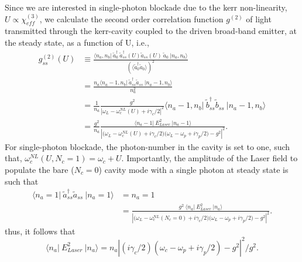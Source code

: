 \documentclass[12pt]{article}
\begin{document}
Since we are interested in single-photon blockade due to the kerr 
non-linearity, $U \propto \chi_{eff}^{(3)}$, we calculate the second order
correlation function $g^{(2)}$ of light transmitted through the kerr-cavity
coupled to the driven broad-band emitter, at the steady state, as a function
of U, i.e.,
\begin{equation}
\begin{split}
g^{(2)}_{ss}(U) &\equiv 
    \frac{ \langle n_a, n_b \vert \:
    \tilde{a}^{\dagger}_0 \: \tilde{a}^{\dagger}_{ss}(U)
    \tilde{a}_{ss}(U) \: \tilde{a}_0 \:
    \vert n_a, n_b \rangle }
    {(\langle \tilde{a}^{\dagger}_0\tilde{a}_0 \rangle)^2}
\\
&= \frac{n_a \langle n_a - 1, n_b \vert \:
    \tilde{a}^{\dagger}_{ss}\tilde{a}_{ss} \:
    \vert n_a - 1, n_b \rangle}
    {n_a^2}
\\
&= \frac{1}{n_a} 
    \frac{g^2}
    {\left\vert \omega_L - \omega_c^{NL}(U) + i\gamma_c/2 \right\vert^2}
    \langle n_a - 1, n_b \vert \:
    \tilde{b}^{\dagger}_{ss}\tilde{b}_{ss} \:
    \vert n_a - 1, n_b \rangle
\\
&= \frac{g^2}{n_a}
    \frac{\langle n_a-1 \vert \: E_{Laser}^2 \: \vert n_a-1 \rangle}
    {\left\vert \big( \omega_L - \omega_c^{NL}(U) + i\gamma_c/2 \big)
    \big( \omega_L - \omega_p + i\gamma_p/2 \big)
    -g^2 \right\vert^2}.
\end{split}
\end{equation}
For single-photon blockade, the photon-number in the cavity is set to one,
such that, $\omega_c^{NL}( U, N_c = 1 )  = \omega_c + U$. Importantly, the
amplitude of the Laser field to populate the bare ($N_c=0$) cavity mode 
with a single photon at steady state is such that
\begin{equation}
\begin{split}
\langle n_a=1 \vert \:
    \tilde{a}^{\dagger}_{ss} \tilde{a}_{ss} \:
    \vert n_a=1 \rangle 
    &= n_a = 1
\\
&= \frac{ g^2 \: 
    \langle n_a \vert \: E_{Laser}^2 \: \vert n_a \rangle}
    {\left\vert \big( \omega_L - \omega_c^{NL}(N_c=0) + i\gamma_c/2 \big)
    \big( \omega_L - \omega_p + i\gamma_p/2 \big)
    -g^2 \right\vert^2}.
\end{split}
\end{equation}
thus, it follows that
\begin{equation}
\langle n_a \vert \: E_{Laser}^2 \: \vert n_a \rangle = n_a
    \left\vert 
    ( i\gamma_c/2 )( \omega_c - \omega_p + i\gamma_p/2 ) -g^2 
    \right\vert^2
    / g^2.
\end{equation}
\end{document}
